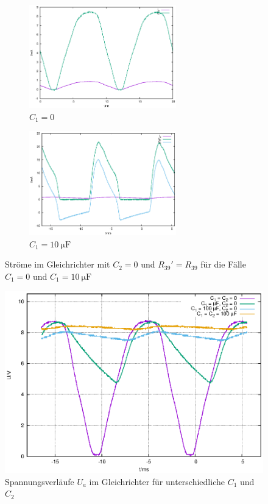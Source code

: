 \documentclass[10pt,a4paper]{scrartcl}
\begin{document}
\begin{figure}[!ht]
    \begin{subfigure}{\textwidth}
        \centering
        \includegraphics[width=0.7\textwidth]
            {graphics/gleichrichter_strom_0F.eps}
        \caption{$C_1=0$}
        \label{fig:Gleichrichter_I_0F}
    \end{subfigure}
    \begin{subfigure}{\textwidth}
        \centering
        \includegraphics[width=0.7\textwidth]
            {graphics/gleichrichter_strom_10uF.eps}
        \caption{$C_1=10~\mathrm{\mu F}$}
        \label{fig:Gleichrichter_I_10uF}
    \end{subfigure}
    \caption{Ströme im Gleichrichter mit $C_2=0$ und $R_{39}'=R_{39}$ für
        die Fälle $C_1=0$ und $C_1=10~\mathrm{\mu F}$}
    \label{fig:Gleichrichter_I}
\end{figure}

\begin{figure}
    \centering
    \includegraphics[width=\textwidth]{graphics/gleichrichter_spannungen.eps}
    \caption{Spannungsverläufe $U_a$ im Gleichrichter für unterschiedliche
    $C_1$ und $C_2$}
    \label{fig:Gleichrichter_U2}
\end{figure}
\end{document}
